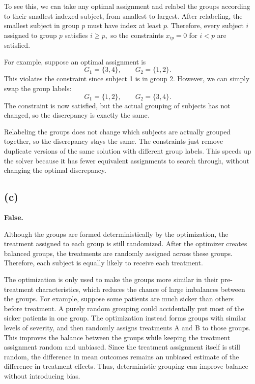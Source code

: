 \documentclass{article}
\begin{document}
To see this, we can take any optimal assignment and relabel the groups according to their smallest-indexed subject, from smallest to largest. After relabeling, the smallest subject in group $p$ must have index at least $p$. Therefore, every subject $i$ assigned to group $p$ satisfies $
i \geq p,
$
so the constraints $x_{ip}=0$ for $i<p$ are satisfied.

For example, suppose an optimal assignment is
\[
G_1 = \{3,4\}, \qquad G_2 = \{1,2\}.
\]
This violates the constraint since subject 1 is in group 2. However, we can simply swap the group labels:
\[
G_1 = \{1,2\}, \qquad G_2 = \{3,4\}.
\]
The constraint is now satisfied, but the actual grouping of subjects has not changed, so the discrepancy is exactly the same.

Relabeling the groups does not change which subjects are actually grouped together, so the discrepancy stays the same. The constraints just remove duplicate versions of the same solution with different group labels. This speeds up the solver because it has fewer equivalent assignments to search through, without changing the optimal discrepancy.
\vspace{5mm}
\subsection*{(c)}


\textbf{False.}

Although the groups are formed deterministically by the optimization, the treatment assigned to each group is still randomized. After the optimizer creates balanced groups, the treatments are randomly assigned across these groups. Therefore, each subject is equally likely to receive each treatment.

The optimization is only used to make the groups more similar in their pre-treatment characteristics, which reduces the chance of large imbalances between the groups. For example, suppose some patients are much sicker than others before treatment. A purely random grouping could accidentally put most of the sicker patients in one group. The optimization instead forms groups with similar levels of severity, and then randomly assigns treatments A and B to those groups. This improves the balance between the groups while keeping the treatment assignment random and unbiased. Since the treatment assignment itself is still random, the difference in mean outcomes remains an unbiased estimate of the difference in treatment effects. Thus, deterministic grouping can improve balance without introducing bias.
\end{document}
